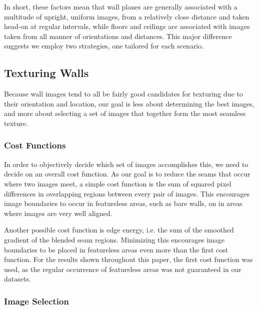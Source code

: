 \documentclass[10pt,twocolumn,letterpaper]{article}
\begin{document}
In short, these factors mean that wall planes are generally associated
with a multitude of upright, uniform images, from a relatively close
distance and taken head-on at regular intervals, while floors and
ceilings are associated with images taken from all manner of
orientations and distances. This major difference suggests we employ
two strategies, one tailored for each scenario.


\subsection{Texturing Walls}
Because wall images tend to all be fairly good candidates for
texturing due to their orientation and location, our goal is less
about determining the best images, and more about selecting a set of
images that together form the most seamless texture.

\subsubsection{Cost Functions}

In order to objectively decide which set of images accomplishes this,
we need to decide on an overall cost function. As our goal is to
reduce the seams that occur where two images meet, a simple cost
function is the sum of squared pixel differences in overlapping
regions between every pair of images. This encourages image boundaries
to occur in featureless areas, such as bare walls, on in areas where
images are very well aligned.

Another possible cost function is edge energy, i.e. the sum of the
smoothed gradient of the blended seam regions. Minimizing this
encourages image boundaries to be placed in featureless areas even
more than the first cost function. For the results shown throughout
this paper, the first cost function was used, as the regular
occurrence of featureless areas was not guaranteed in our datasets.

\subsubsection{Image Selection}
\end{document}
